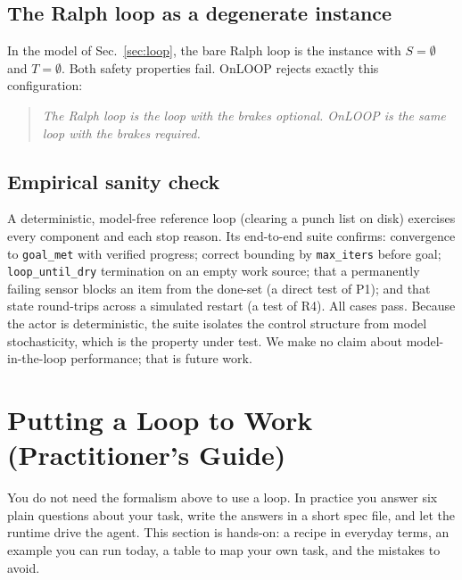 \documentclass[10pt,twocolumn,letterpaper]{article}
\begin{document}
\subsection{The Ralph loop as a degenerate instance}
In the model of Sec.~\ref{sec:loop}, the bare Ralph loop is the instance with
$S = \emptyset$ and $T = \emptyset$. Both safety properties fail. OnLOOP rejects
exactly this configuration:
\begin{quote}\itshape
The Ralph loop is the loop with the brakes optional. OnLOOP is the same loop
with the brakes required.
\end{quote}

\subsection{Empirical sanity check}
A deterministic, model-free reference loop (clearing a punch list on disk)
exercises every component and each stop reason. Its end-to-end suite confirms:
convergence to \texttt{goal\_met} with verified progress; correct bounding by
\texttt{max\_iters} before goal; \texttt{loop\_until\_dry} termination on an empty
work source; that a permanently failing sensor blocks an item from the done-set
(a direct test of P1); and that state round-trips across a simulated restart (a
test of R4). All cases pass. Because the actor is deterministic, the suite
isolates the control structure from model stochasticity, which is the property
under test. We make no claim about model-in-the-loop performance; that is future
work.

\section{Putting a Loop to Work (Practitioner's Guide)}
\label{sec:integrate}
You do not need the formalism above to use a loop. In practice you answer six
plain questions about your task, write the answers in a short spec file, and let
the runtime drive the agent. This section is hands-on: a recipe in everyday
terms, an example you can run today, a table to map your own task, and the
mistakes to avoid.
\end{document}

